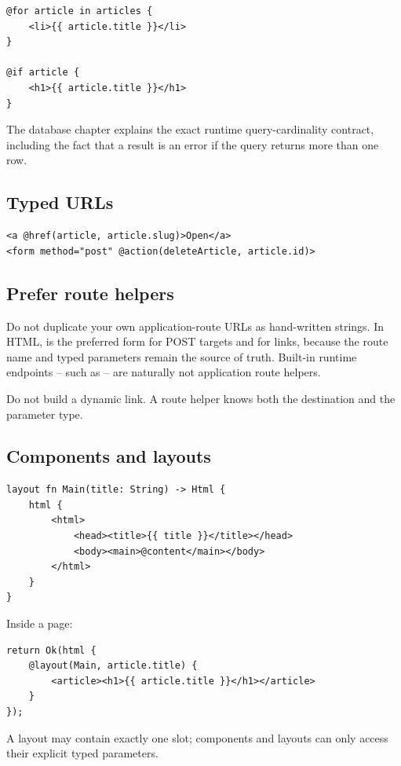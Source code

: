 \begin{lstlisting}[language=RWLang]
@for article in articles {
    <li>{{ article.title }}</li>
}

@if article {
    <h1>{{ article.title }}</h1>
}
\end{lstlisting}

The database chapter explains the exact runtime query-cardinality contract, including the fact that a  result is an error if the query returns more than one row.

\subsection*{Typed URLs}

\begin{lstlisting}[language=RWLang]
<a @href(article, article.slug)>Open</a>
<form method="post" @action(deleteArticle, article.id)>
\end{lstlisting}

\subsection*{Prefer route helpers}

Do not duplicate your own application-route URLs as hand-written strings. In HTML,  is the preferred form for POST targets and  for links, because the route name and typed parameters remain the source of truth. Built-in runtime endpoints -- such as  -- are naturally not application route helpers.

Do not build a dynamic  link. A route helper knows both the destination and the parameter type.

\subsection*{Components and layouts}

\begin{lstlisting}[language=RWLang]
layout fn Main(title: String) -> Html {
    html {
        <html>
            <head><title>{{ title }}</title></head>
            <body><main>@content</main></body>
        </html>
    }
}
\end{lstlisting}

Inside a page:

\begin{lstlisting}[language=RWLang]
return Ok(html {
    @layout(Main, article.title) {
        <article><h1>{{ article.title }}</h1></article>
    }
});
\end{lstlisting}

A layout may contain exactly one  slot; components and layouts can only access their explicit typed parameters.
